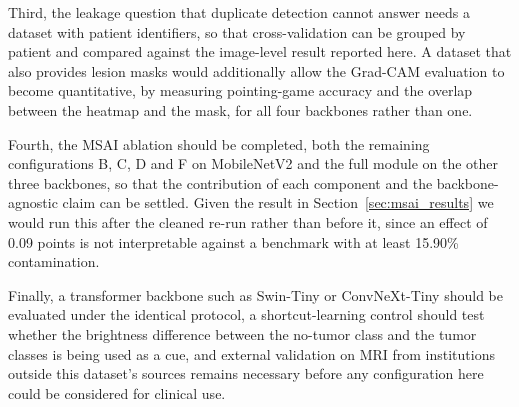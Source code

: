 \documentclass[11pt]{article}
\begin{document}
Third, the leakage question that duplicate detection cannot answer needs a dataset with patient identifiers, so that cross-validation can be grouped by patient and compared against the image-level result reported here. A dataset that also provides lesion masks would additionally allow the Grad-CAM evaluation to become quantitative, by measuring pointing-game accuracy and the overlap between the heatmap and the mask, for all four backbones rather than one.

Fourth, the MSAI ablation should be completed, both the remaining configurations B, C, D and F on MobileNetV2 and the full module on the other three backbones, so that the contribution of each component and the backbone-agnostic claim can be settled. Given the result in Section~\ref{sec:msai_results} we would run this after the cleaned re-run rather than before it, since an effect of 0.09 points is not interpretable against a benchmark with at least 15.90\% contamination.

Finally, a transformer backbone such as Swin-Tiny or ConvNeXt-Tiny should be evaluated under the identical protocol, a shortcut-learning control should test whether the brightness difference between the no-tumor class and the tumor classes is being used as a cue, and external validation on MRI from institutions outside this dataset's sources remains necessary before any configuration here could be considered for clinical use.



\end{document}
